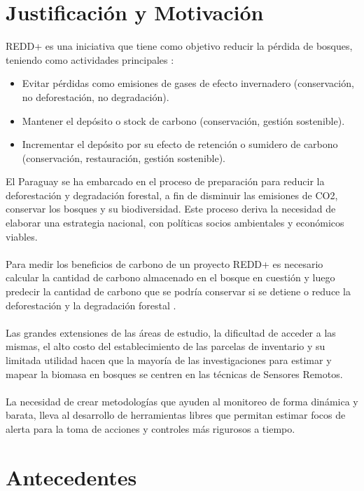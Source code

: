 \section{Justificaci\'on y Motivaci\'on}

REDD+ es una iniciativa que tiene como objetivo reducir la p\'erdida de bosques, teniendo como actividades principales \cite{peralta2013analisis}:
\begin{itemize}
	\item Evitar p\'erdidas como emisiones de gases de efecto invernadero (conservaci\'on, no deforestaci\'on, no degradaci\'on).
	\item Mantener el dep\'osito o stock de carbono (conservaci\'on, gesti\'on sostenible).
	\item Incrementar el dep\'osito por su efecto de retenci\'on o sumidero de carbono (conservaci\'on, restauraci\'on, gesti\'on sostenible).
\end{itemize}

El Paraguay se ha embarcado en el proceso de preparaci\'on para reducir la deforestaci\'on y degradaci\'on forestal, a fin de disminuir las emisiones de CO2, conservar los bosques y su biodiversidad. Este proceso deriva la necesidad de elaborar una estrategia nacional, con pol\'iticas socios ambientales y econ\'omicos viables.\\~\\
Para medir los beneficios de carbono de un proyecto REDD+ es necesario calcular la cantidad de carbono almacenado en el bosque en cuesti\'on y luego predecir la cantidad de carbono que se podr\'ia conservar si se detiene o reduce la deforestaci\'on y la degradaci\'on forestal \cite{nellemann2009carbono}.\\~\\
Las grandes extensiones de las \'areas de estudio, la dificultad de acceder a las mismas, el alto costo del establecimiento de las parcelas de inventario y su limitada utilidad hacen que la mayor\'ia de las investigaciones para estimar y mapear la biomasa en bosques se centren en las t\'ecnicas de Sensores Remotos. \\~\\
La necesidad de crear metodolog\'ias que ayuden al monitoreo de forma din\'amica y barata, lleva al desarrollo de herramientas libres que permitan estimar focos de alerta para la toma de acciones y controles m\'as rigurosos a tiempo.


\section{Antecedentes}

